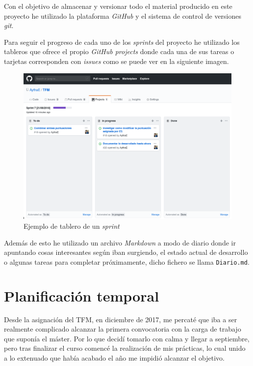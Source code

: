 Con el objetivo de almacenar y versionar todo el material producido en este proyecto he utilizado la plataforma \textit{GitHub} y el sistema de control de versiones \textit{git}.

Para seguir el progreso de cada uno de los \textit{sprints} del proyecto he utilizado los tableros que ofrece el propio \textit{GitHub projects} donde cada una de sus tareas o tarjetas corresponden con \textit{issues} como se puede ver en la siguiente imagen. 

\begin{figure}[h]
	
	\centering
	\includegraphics[width=\linewidth]{imagenes/ejemplo_tablero_sprint}
	\caption{Ejemplo de tablero de un \textit{sprint}}
	\label{fig:tableroSprint}
\end{figure}

Además de esto he utilizado un archivo \textit{Markdown} a modo de diario donde ir apuntando cosas interesantes según iban surgiendo, el estado actual de desarrollo o algunas tareas para completar próximamente, dicho fichero se llama \texttt{Diario.md}.

\section{Planificación temporal}

Desde la asignación del \acrshort{TFM}, en diciembre de 2017, me percaté que iba a ser realmente complicado alcanzar la primera convocatoria con la carga de trabajo que suponía el máster. Por lo que decidí tomarlo con calma y llegar a septiembre, pero tras finalizar el curso comencé la realización de mis prácticas, lo cual unido a lo extenuado que había acabado el año me impidió alcanzar el objetivo. 

